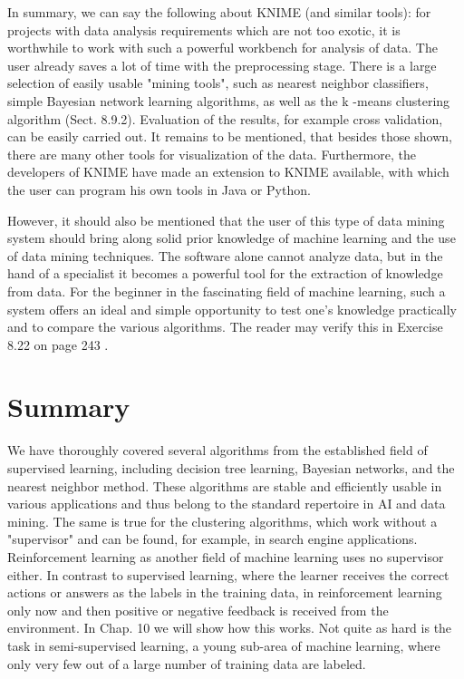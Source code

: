 \documentclass[10pt]{book}
\begin{document}
In summary, we can say the following about KNIME (and similar tools): for projects with data analysis requirements which are not too exotic, it is worthwhile to work with such a powerful workbench for analysis of data. The user already saves a lot of time with the preprocessing stage. There is a large selection of easily usable "mining tools", such as nearest neighbor classifiers, simple Bayesian network learning algorithms, as well as the k -means clustering algorithm (Sect. 8.9.2). Evaluation of the results, for example cross validation, can be easily carried out. It remains to be mentioned, that besides those shown, there are many other tools for visualization of the data. Furthermore, the developers of KNIME have made an extension to KNIME available, with which the user can program his own tools in Java or Python.

However, it should also be mentioned that the user of this type of data mining system should bring along solid prior knowledge of machine learning and the use of data mining techniques. The software alone cannot analyze data, but in the hand of a specialist it becomes a powerful tool for the extraction of knowledge from data. For the beginner in the fascinating field of machine learning, such a system offers an ideal and simple opportunity to test one's knowledge practically and to compare the various algorithms. The reader may verify this in Exercise 8.22 on page 243 .

\section{Summary}
We have thoroughly covered several algorithms from the established field of supervised learning, including decision tree learning, Bayesian networks, and the nearest neighbor method. These algorithms are stable and efficiently usable in various applications and thus belong to the standard repertoire in AI and data mining. The same is true for the clustering algorithms, which work without a "supervisor" and can be found, for example, in search engine applications. Reinforcement learning as another field of machine learning uses no supervisor either. In contrast to supervised learning, where the learner receives the correct actions or answers as the labels in the training data, in reinforcement learning only now and then positive or negative feedback is received from the environment. In Chap. 10 we will show how this works. Not quite as hard is the task in semi-supervised learning, a young sub-area of machine learning, where only very few out of a large number of training data are labeled.
\end{document}
